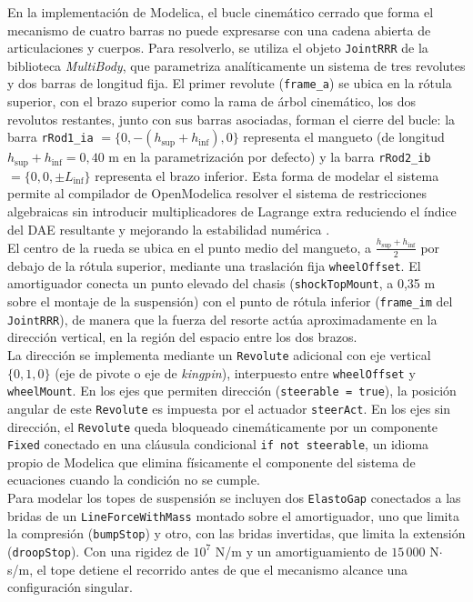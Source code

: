 En la implementación de Modelica, el bucle cinemático cerrado que forma el mecanismo de cuatro barras no puede expresarse con una cadena abierta de articulaciones y cuerpos. Para resolverlo, se utiliza el objeto \verb|JointRRR| de la biblioteca \textit{MultiBody}, que parametriza analíticamente un sistema de tres revolutes y dos barras de longitud fija. El primer revolute (\verb|frame_a|) se ubica en la rótula superior, con el brazo superior como la rama de árbol cinemático, los dos revolutos restantes, junto con sus barras asociadas, forman el cierre del bucle: la barra \verb|rRod1_ia| $= \{0, -(h_\text{sup} + h_\text{inf}), 0\}$ representa el mangueto (de longitud $h_\text{sup} + h_\text{inf} = 0{,}40$ m en la parametrización por defecto) y la barra \verb|rRod2_ib| $= \{0, 0, \pm L_\text{inf}\}$ representa el brazo inferior. Esta forma de modelar el sistema permite al compilador de OpenModelica resolver el sistema de restricciones algebraicas sin introducir multiplicadores de Lagrange extra reduciendo el índice del DAE resultante y mejorando la estabilidad numérica \cite{otter2003}.\\

El centro de la rueda se ubica en el punto medio del mangueto, a $\frac{h_\text{sup} + h_\text{inf}}{2}$ por debajo de la rótula superior, mediante una traslación fija \verb|wheelOffset|. El amortiguador conecta un punto elevado del chasis (\verb|shockTopMount|, a 0{,}35 m sobre el montaje de la suspensión) con el punto de rótula inferior (\verb|frame_im| del \verb|JointRRR|), de manera que la fuerza del resorte actúa aproximadamente en la dirección vertical, en la región del espacio entre los dos brazos.\\

La dirección se implementa mediante un \verb|Revolute| adicional con eje vertical $\{0,1,0\}$ (eje de pivote o eje de \textit{kingpin}), interpuesto entre \verb|wheelOffset| y \verb|wheelMount|. En los ejes que permiten dirección (\verb|steerable = true|), la posición angular de este \verb|Revolute| es impuesta por el actuador \verb|steerAct|. En los ejes sin dirección, el \verb|Revolute| queda bloqueado cinemáticamente por un componente \verb|Fixed| conectado en una cláusula condicional \verb|if not steerable|, un idioma propio de Modelica que elimina físicamente el componente del sistema de ecuaciones cuando la condición no se cumple.\\

Para modelar los topes de suspensión se incluyen dos \verb|ElastoGap| conectados a las bridas de un \verb|LineForceWithMass| montado sobre el amortiguador, uno que limita la compresión (\verb*|bumpStop|) y otro, con las bridas invertidas, que limita la extensión (\verb*|droopStop|). Con una rigidez de $10^7$ N/m y un amortiguamiento de $15\,000$ N$\cdot$s/m, el tope detiene el recorrido antes de que el mecanismo alcance una configuración singular.\\


